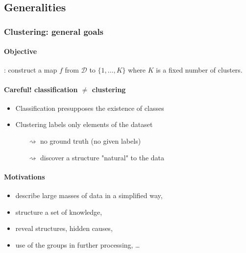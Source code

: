 \documentclass{beamer}\usepackage[]{graphicx}\usepackage[]{color}
\begin{document}
\subsection{Generalities}

\begin{frame}[label=Clustering1]
  \frametitle{Clustering: general goals}

  \paragraph{Objective}: construct a map $f$ from $\mathcal{D}$ to $\{1,\ldots,K\}$ where $K$ is a fixed number of clusters.
    
  \vfill
    
  \paragraph{Careful! classification $\neq$ clustering}
      \begin{itemize}
      \item Classification presupposes the existence of classes
      \item Clustering labels only elements of the dataset
      \begin{itemize}
      \item[$\rightsquigarrow$] no ground truth (no given labels)
      \item[$\rightsquigarrow$] discover a structure "natural" to the data
      \end{itemize}
      \end{itemize}
  
  \vfill

  \paragraph{Motivations}
    \begin{itemize}
    \item describe large masses of data in a simplified way,
    \item structure a set of knowledge,
    \item reveal structures, hidden causes,
    \item use of the groups in further processing, \dots
  \end{itemize}

\end{frame}
\end{document}
